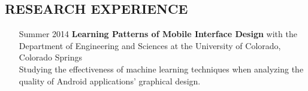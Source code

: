 \documentclass{res}     %
\begin{document}
\begin{resume}
\section{RESEARCH EXPERIENCE}
\vspace{5mm}
\begin{itemize}[font=\itshape,align=parleft,labelwidth=3cm,leftmargin=2cm]
    \item[Summer 2014]
        \textbf{Learning Patterns of Mobile Interface Design}
        with the Department of Engineering and Sciences
        at the University of Colorado, Colorado Springs
        \vspace{1mm} \\
        Studying the effectiveness of machine learning techniques when analyzing the quality of Android applications' graphical design.
\end{itemize}



\end{resume}
\end{document}

